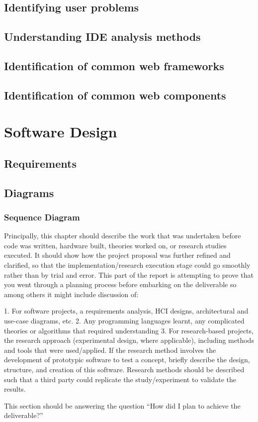 \subsection{Identifying user problems}
\subsection{Understanding IDE analysis methods}
\subsection{Identification of common web frameworks}
\subsection{Identification of common web components}

\section{Software Design}
\subsection{Requirements}
\subsection{Diagrams}
\subsubsection{Sequence Diagram}


Principally, this chapter should describe the work that was undertaken before
code was written, hardware built, theories worked on, or research studies
executed. It should show how the project proposal was further refined and
clarified, so that the implementation/research execution stage could go
smoothly rather than by trial and error. This part of the report is attempting to
prove that you went through a planning process before embarking on the
deliverable so among others it might include discussion of:

1. For software projects, a requirements analysis, HCI designs, architectural
and use-case diagrams, etc.
2. Any programming languages learnt, any complicated theories or algorithms
that required understanding
3. For research-based projects, the research approach (experimental design,
where applicable), including methods and tools that were used/applied. If the
research method involves the development of prototypic software to test a
concept, briefly describe the design, structure, and creation of this software.
Research methods should be described such that a third party could replicate
the study/experiment to validate the results.

This section should be answering the question “How did I plan to achieve the
deliverable?”
